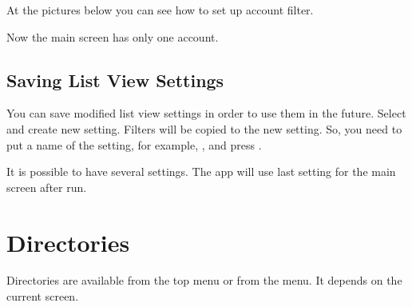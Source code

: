 \documentclass[a4paper,10pt,english]{sphinxmanual}
\begin{document}
\sphinxAtStartPar
At the pictures below you can see how to set up account filter.

\noindent{}
\noindent{}
\noindent{}
\noindent{}
\noindent{}
\noindent{}

\sphinxAtStartPar
Now the main screen has only one  account.


\section{Saving List View Settings}
\label{\detokenize{main-screen:saving-list-view-settings}}
\sphinxAtStartPar
You can save modified list view settings in order to use them in the future. Select
 and create new setting. Filters will be copied to the new setting.
So, you need to put a name of the setting, for example, , and
press .

\noindent{}
\noindent{}

\sphinxAtStartPar
It is possible to have several settings. The app will use last setting for the main screen
after run.

\sphinxstepscope


\chapter{Directories}
\label{\detokenize{directories:directories}}\label{\detokenize{directories:chapter-directories}}\label{\detokenize{directories::doc}}
\sphinxAtStartPar
Directories are available from the top menu or from the  menu.
It depends on the current screen.

\noindent{}
\noindent{}
\end{document}
